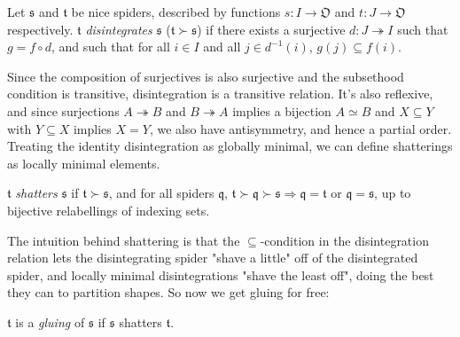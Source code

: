 \begin{defn}[Disintegration]
Let $\mathfrak{s}$ and $\mathfrak{t}$ be nice spiders, described by functions $s: I \rightarrow \mathfrak{O}$ and $t: J \rightarrow \mathfrak{O}$ respectively. $\mathfrak{t}$ \emph{disintegrates} $\mathfrak{s}$ ($\mathfrak{t} \succ \mathfrak{s}$) if there exists a surjective $d: J \twoheadrightarrow I$ such that $g = f \circ d$, and such that for all $i \in I$ and all $j \in d^{-1}(i)$, $g(j) \subseteq f(i)$.
\end{defn}

Since the composition of surjectives is also surjective and the subsethood condition is transitive, disintegration is a transitive relation. It's also reflexive, and since surjections $A \twoheadrightarrow B$ and $B \twoheadrightarrow A$ implies a bijection $A \simeq B$ and $X \subseteq Y$ with $Y \subseteq X$ implies $X = Y$, we also have antisymmetry, and hence a partial order. Treating the identity disintegration as globally minimal, we can define shatterings as locally minimal elements.

\begin{defn}
$\mathfrak{t}$ \emph{shatters} $\mathfrak{s}$ if $\mathfrak{t} \succ \mathfrak{s}$, and for all spiders $\mathfrak{q}$, $\mathfrak{t} \succ \mathfrak{q} \succ \mathfrak{s} \Rightarrow \mathfrak{q} = \mathfrak{t}$ or $\mathfrak{q} = \mathfrak{s}$, up to bijective relabellings of indexing sets.
\end{defn}

The intuition behind shattering is that the $\subseteq$-condition in the disintegration relation lets the disintegrating spider "shave a little" off of the disintegrated spider, and locally minimal disintegrations "shave the least off", doing the best they can to partition shapes. So now we get gluing for free:

\begin{defn}
$\mathfrak{t}$ is a \emph{gluing} of $\mathfrak{s}$ if $\mathfrak{s}$ shatters $\mathfrak{t}$.
\end{defn}

